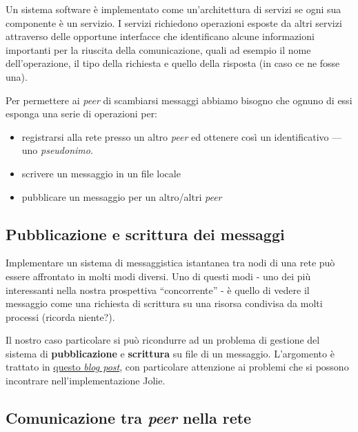 \documentclass[
]{article}
\begin{document}
Un sistema software è implementato come un'architettura di servizi se
ogni sua componente è un servizio. I servizi richiedono operazioni
esposte da altri servizi attraverso delle opportune interfacce che
identificano alcune informazioni importanti per la riuscita della
comunicazione, quali ad esempio il nome dell'operazione, il tipo della
richiesta e quello della risposta (in caso ce ne fosse una).

Per permettere ai \emph{peer} di scambiarsi messaggi abbiamo bisogno che
ognuno di essi esponga una serie di operazioni per: 
\begin{itemize}
  \item registrarsi alla rete presso un altro \emph{peer} ed ottenere così un identificativo --- uno \emph{pseudonimo}.
  \item scrivere un messaggio in un file locale 
  \item pubblicare un messaggio per un altro/altri \emph{peer}
\end{itemize}

\hypertarget{pubblicazione-e-scrittura-dei-messaggi}{%
\subsection{Pubblicazione e scrittura dei
messaggi}\label{pubblicazione-e-scrittura-dei-messaggi}}

Implementare un sistema di messaggistica istantanea tra nodi di una rete
può essere affrontato in molti modi diversi. Uno di questi modi - uno
dei più interessanti nella nostra prospettiva ``concorrente'' - è quello
di vedere il messaggio come una richiesta di scrittura su una risorsa
condivisa da molti processi (ricorda niente?).

Il nostro caso particolare si può ricondurre ad un problema di gestione
del sistema di \textbf{pubblicazione} e \textbf{scrittura} su file di un
messaggio. L'argomento è trattato in
\href{https://spz.netlify.app/teaching/2020/05/12/appunti-jolie-publisher-writer}{questo
\emph{blog post}}, con particolare attenzione ai problemi che si possono
incontrare nell'implementazione Jolie.

\hypertarget{comunicazione-tra-peer-nella-rete}{%
\subsection{\texorpdfstring{Comunicazione tra \emph{peer} nella
rete}{Comunicazione tra peer nella rete}}\label{comunicazione-tra-peer-nella-rete}}
\end{document}
